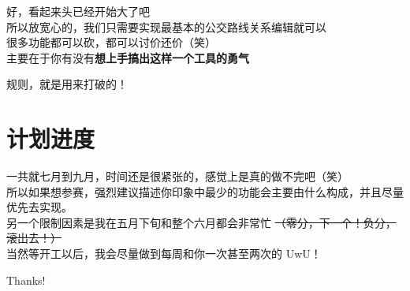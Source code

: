 \documentclass{beamer}
\begin{document}
\begin{frame}
	\Large
	好，看起来头已经开始大了吧 \\
	\large
	\quad \quad 所以放宽心的，我们只需要实现最基本的公交路线关系编辑就可以 \\
	\quad \quad 很多功能都可以砍，都可以讨价还价（笑）\\
	\quad \quad 主要在于你有没有\textbf{想上手搞出这样一个工具的勇气}
\end{frame}

\begin{frame}
	\Huge
	规则，就是用来打破的！
\end{frame}

\section{计划进度}
\begin{frame}
	\quad \quad 一共就七月到九月，时间还是很紧张的，感觉上是真的做不完吧（笑） \\
	    
	\quad \quad 所以如果想参赛，强烈建议描述你印象中最少的功能会主要由什么构成，并且尽量优先去实现。\\
	
	\quad \quad 另一个限制因素是我在五月下旬和整个六月都会非常忙
	\sout{\small （零分，下一个！负分，滚出去！）}\\
	
	\quad \quad 当然等开工以后，我会尽量做到每周和你一次甚至两次的 UwU！
\end{frame}

\begin{frame}
	\begin{center}
		{\Huge\calligra Thanks!}
	\end{center}
\end{frame}
\end{document}
